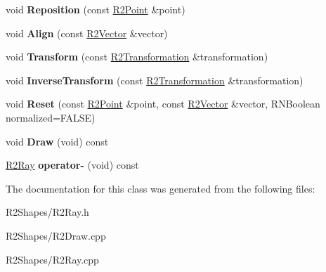 \begin{DoxyCompactItemize}
\item 
void {\bfseries Reposition} (const \hyperlink{class_r2_point}{R2\+Point} \&point)\hypertarget{class_r2_ray_a043b87437606ba3f564fd60ecbad4fa8}{}\label{class_r2_ray_a043b87437606ba3f564fd60ecbad4fa8}

\item 
void {\bfseries Align} (const \hyperlink{class_r2_vector}{R2\+Vector} \&vector)\hypertarget{class_r2_ray_a96ced27e70e017184454273d74af669d}{}\label{class_r2_ray_a96ced27e70e017184454273d74af669d}

\item 
void {\bfseries Transform} (const \hyperlink{class_r2_transformation}{R2\+Transformation} \&transformation)\hypertarget{class_r2_ray_afd2b0b25f59be8d3b2c146711e17d46c}{}\label{class_r2_ray_afd2b0b25f59be8d3b2c146711e17d46c}

\item 
void {\bfseries Inverse\+Transform} (const \hyperlink{class_r2_transformation}{R2\+Transformation} \&transformation)\hypertarget{class_r2_ray_a9f1c091209e28ad4c843f075aff52889}{}\label{class_r2_ray_a9f1c091209e28ad4c843f075aff52889}

\item 
void {\bfseries Reset} (const \hyperlink{class_r2_point}{R2\+Point} \&point, const \hyperlink{class_r2_vector}{R2\+Vector} \&vector, R\+N\+Boolean normalized=F\+A\+L\+SE)\hypertarget{class_r2_ray_ae3309647b6a788cf9825127270bd89b8}{}\label{class_r2_ray_ae3309647b6a788cf9825127270bd89b8}

\item 
void {\bfseries Draw} (void) const \hypertarget{class_r2_ray_a5c6a95e861f6f14747e352bf7e88530f}{}\label{class_r2_ray_a5c6a95e861f6f14747e352bf7e88530f}

\item 
\hyperlink{class_r2_ray}{R2\+Ray} {\bfseries operator-\/} (void) const \hypertarget{class_r2_ray_a1ca8b7a3e669f479ace6da7b0b301063}{}\label{class_r2_ray_a1ca8b7a3e669f479ace6da7b0b301063}

\end{DoxyCompactItemize}


The documentation for this class was generated from the following files\+:\begin{DoxyCompactItemize}
\item 
R2\+Shapes/R2\+Ray.\+h\item 
R2\+Shapes/R2\+Draw.\+cpp\item 
R2\+Shapes/R2\+Ray.\+cpp\end{DoxyCompactItemize}
